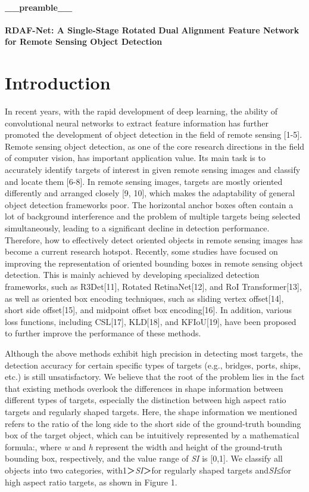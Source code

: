 \documentclass[10pt,twocolumn,final]{article}
\begin{document}
\paragraph{ \_\_preamble\_\_ }

\textbf{RDAF-Net: A Single-Stage Rotated }\textbf{Dual}\textbf{ Alignment Feature Network for Remote Sensing Object Detection}

\section{ Introduction }

In recent years, with the rapid development of deep learning, the ability of convolutional neural networks to extract feature information has further promoted the development of object detection in the field of remote sensing [1-5]. Remote sensing object detection, as one of the core research directions in the field of computer vision, has important application value. Its main task is to accurately identify targets of interest in given remote sensing images and classify and locate them [6-8]. In remote sensing images, targets are mostly oriented differently and arranged closely [9, 10], which makes the adaptability of general object detection frameworks poor. The horizontal anchor boxes often contain a lot of background interference and the problem of multiple targets being selected simultaneously, leading to a significant decline in detection performance. Therefore, how to effectively detect oriented objects in remote sensing images has become a current research hotspot. Recently, some studies have focused on improving the representation of oriented bounding boxes in remote sensing object detection. This is mainly achieved by developing specialized detection frameworks, such as R3Det[11], Rotated RetinaNet[12], and RoI Transformer[13], as well as oriented box encoding techniques, such as sliding vertex offset[14], short side offset[15], and midpoint offset box encoding[16]. In addition, various loss functions, including CSL[17], KLD[18], and KFIoU[19], have been proposed to further improve the performance of these methods.

Although the above methods exhibit high precision in detecting most targets, the detection accuracy for certain specific types of targets (e.g., bridges, ports, ships, etc.) is still unsatisfactory. We believe that the root of the problem lies in the fact that existing methods overlook the differences in shape information between different types of targets, especially the distinction between high aspect ratio targets and regularly shaped targets. Here, the shape information we mentioned refers to the ratio of the long side to the short side of the ground-truth bounding box of the target object, which can be intuitively represented by a mathematical formula:, where \textit{w} and \textit{h} represent the width and height of the ground-truth bounding box, respectively, and the value range of \textit{SI} is [0,1]. We classify all objects into two categories, with1＞\textit{SI}＞for regularly shaped targets and\textit{SI}≤for high aspect ratio targets, as shown in Figure 1.
\end{document}
